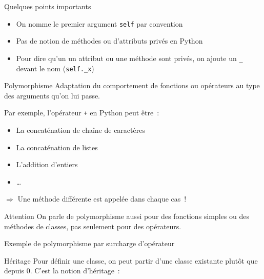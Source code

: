 \begin{frame}{Quelques points importants}
  \begin{itemize}
    \item On nomme le premier argument \texttt{self} par convention
    \item Pas de notion de méthodes ou d'attributs privés en Python
    \item Pour \alert{dire} qu'un un attribut ou une méthode sont privés, on ajoute un \texttt{\_} devant le nom (\texttt{self.\_x})
  \end{itemize}
\end{frame}

\begin{frame}{Polymorphisme}
  Adaptation du comportement de fonctions ou opérateurs au type des arguments qu'on lui passe.

  Par exemple, l'opérateur \texttt{+} en Python peut être~:

  \begin{itemize}
    \item La concaténation de chaîne de caractères
    \item La concaténation de listes
    \item L'addition d'entiers
    \item …
  \end{itemize}

  $\Rightarrow$ Une méthode différente est appelée dans chaque cas~!

  \begin{alertblock}{Attention}
    On parle de polymorphisme aussi pour des fonctions simples ou des méthodes de classes, pas seulement pour des opérateurs.
  \end{alertblock}
\end{frame}

\begin{frame}{Exemple de polymorphisme par surcharge d'opérateur}
\end{frame}

\begin{frame}{Héritage}
  Pour définir une classe, on peut partir d'une classe existante plutôt que depuis 0. C'est la notion d'héritage~:

\end{frame}

